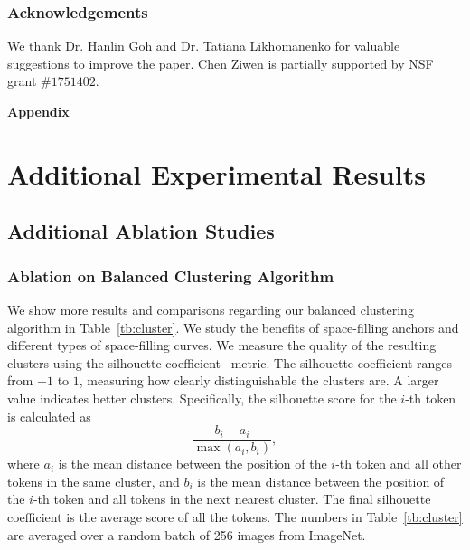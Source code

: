 \documentclass[10pt,twocolumn,letterpaper]{article}
\begin{document}
\subsubsection*{Acknowledgements}
We thank Dr. Hanlin Goh and Dr. Tatiana Likhomanenko for valuable suggestions to improve the paper. Chen Ziwen is partially supported by NSF grant $\#1751402$.




{\small


}


\clearpage


\appendix

\noindent                                                                                                               \textbf{\huge Appendix}
\vspace{0.25in}


\section{Additional Experimental Results}
\subsection{Additional Ablation Studies}

\subsubsection{Ablation on Balanced Clustering Algorithm}

We show more results and comparisons regarding our balanced clustering algorithm in Table~\ref{tb:cluster}. We study the benefits of space-filling anchors and different types of space-filling curves. We measure the quality of the resulting clusters using the silhouette coefficient~\cite{silhouettes} metric. The silhouette coefficient ranges from $-1$ to $1$, measuring  how clearly distinguishable the clusters are. A larger value indicates better clusters. Specifically, the silhouette score for the $i$-th token is calculated as
\begin{equation}
    \dfrac{b_i-a_i}{\max(a_i,b_i)},
\end{equation}
where $a_i$ is the mean distance between the position of the $i$-th token and all other tokens in the same cluster, and $b_i$ is the mean distance between the position of the $i$-th token and all tokens in the next nearest cluster. The final silhouette coefficient is the average score of all the tokens. The numbers in Table~\ref{tb:cluster} are averaged over a random batch of 256 images from ImageNet.
\end{document}
